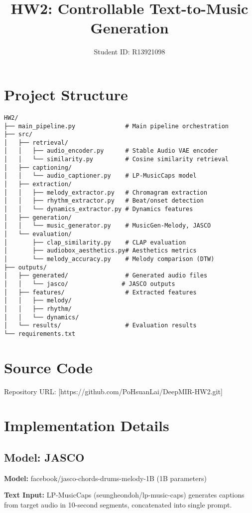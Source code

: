 \documentclass{article}
\title{HW2: Controllable Text-to-Music Generation}
\author{Student ID: R13921098}
\date{}
\begin{document}
\maketitle

\section{Project Structure}

\begin{verbatim}
HW2/
├── main_pipeline.py              # Main pipeline orchestration
├── src/
│   ├── retrieval/
│   │   ├── audio_encoder.py      # Stable Audio VAE encoder
│   │   └── similarity.py         # Cosine similarity retrieval
│   ├── captioning/
│   │   └── audio_captioner.py    # LP-MusicCaps model
│   ├── extraction/
│   │   ├── melody_extractor.py   # Chromagram extraction
│   │   ├── rhythm_extractor.py   # Beat/onset detection
│   │   └── dynamics_extractor.py # Dynamics features
│   ├── generation/
│   │   └── music_generator.py    # MusicGen-Melody, JASCO
│   └── evaluation/
│       ├── clap_similarity.py    # CLAP evaluation
│       ├── audiobox_aesthetics.py# Aesthetics metrics
│       └── melody_accuracy.py    # Melody comparison (DTW)
├── outputs/
│   ├── generated/                # Generated audio files
│   │   └── jasco/               # JASCO outputs
│   ├── features/                 # Extracted features
│   │   ├── melody/
│   │   ├── rhythm/
│   │   └── dynamics/
│   └── results/                  # Evaluation results
└── requirements.txt
\end{verbatim}

\section{Source Code}

Repository URL: [https://github.com/PoHsuanLai/DeepMIR-HW2.git]

\section{Implementation Details}

\subsection{Model: JASCO}

\textbf{Model:} facebook/jasco-chords-drums-melody-1B (1B parameters)

\textbf{Text Input:} LP-MusicCaps (seungheondoh/lp-music-caps) generates captions from target audio in 10-second segments, concatenated into single prompt.
\end{document}
